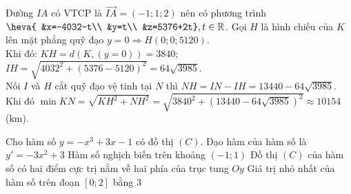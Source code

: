 \begin{ex}
{\begin{itemchoice}
			Đường $IA$ có VTCP là $\overrightarrow{IA}=(-1;1;2)$ nên có phương trình $\heva{ &x=-4032-t\\ &y=t\\ &z=5376+2t} ,t\in \mathbb{R}$.
			\itemch 
			Gọi $H$ là hình chiếu của $K$ lên mặt phẳng quỹ đạo $ y=0\Rightarrow H(0;0;5120)$.\\
			Khi đó: $KH=d(K,(y=0))=3840$; $IH=\sqrt{4032^2+(5376-5120)^2}=64\sqrt{3985}$.\\
			Nối $I$ và $H$ cắt quỹ đạo vệ tinh tại $N$ thì $NH=IN-IH=13440-64\sqrt{3985}$.\\
			Khi đó $\min KN=\sqrt{KH^2+NH^2}=\sqrt{3840^2+(13440-64\sqrt{3985})^2}\approx 10154$ (km).
		\end{itemchoice}
	}
\end{ex}

\begin{ex}%
	Cho hàm số $y = -x^3 + 3x - 1$ có đồ thị $(C)$.
		\choiceTF
		{\True Đạo hàm của hàm số là $y' = -3x^2 + 3$}
		{Hàm số nghịch biến trên khoảng $(-1;1)$}
		{\True Đồ thị $(C)$ của hàm số có hai điểm cực trị nằm về hai phía của trục tung $Oy$}
		{Giá trị nhỏ nhất của hàm số trên đoạn $[0;2]$ bằng $3$}
\end{ex}


